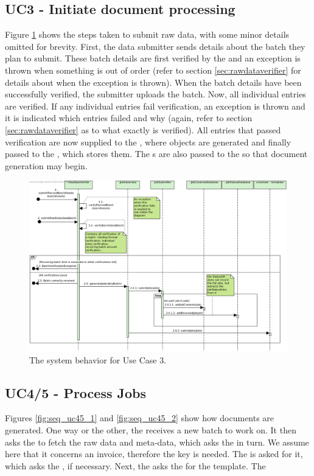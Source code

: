\subsection{UC3 - Initiate document processing}
Figure \ref{fig:seq_uc3} shows the steps taken to submit raw data, with some minor details omitted for brevity. First, the data submitter sends details about the batch they plan to submit. These batch details are first verified by the  and an exception is thrown when something is out of order (refer to section \ref{sec:rawdataverifier} for details about when the exception is thrown). When the batch details have been successfully verified, the submitter uploads the batch. Now, all individual entries are verified. If any individual entries fail verification, an exception is thrown and it is indicated which entries failed and why (again, refer to section \ref{sec:rawdataverifier} as to what exactly is verified). All entries that passed verification are now supplied to the , where  objects are generated and finally passed to the , which stores them. The s are also passed to the  so that document generation may begin. 

\begin{figure}[!htp]
    \centering
    \includegraphics[width=\textwidth]{figures/UC3 - Initiate document processing.png}
    \caption{The system behavior for Use Case 3.
        }\label{fig:seq_uc3}
\end{figure}

\subsection{UC4/5 - Process Jobs}
Figures \ref{fig:seq_uc45_1} and \ref{fig:seq_uc45_2} show how documents are generated. One way or the other, the  receives a new batch to work on. It then asks the  to fetch the raw data and meta-data, which asks the  in turn. We assume here that it concerns an invoice, therefore the key is needed. The  is asked for it, which asks the , if necessary. Next, the  asks the  for the template. The 

